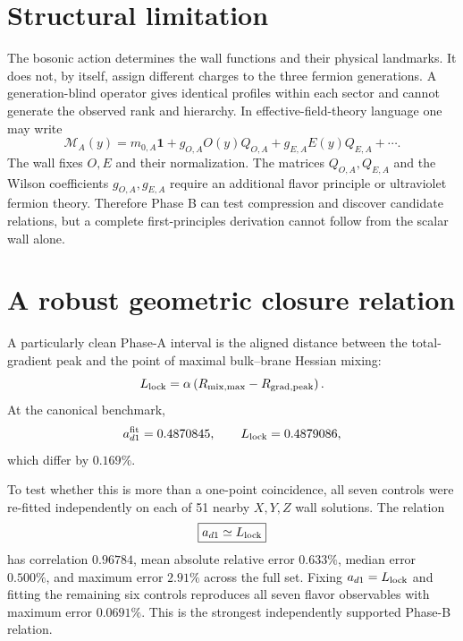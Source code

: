 \documentclass[11pt]{article}
\begin{document}
\section{Structural limitation}
The bosonic action determines the wall functions and their physical landmarks.  It does not, by itself, assign different charges to the three fermion generations.  A generation-blind operator gives identical profiles within each sector and cannot generate the observed rank and hierarchy.  In effective-field-theory language one may write
\begin{equation}
\mathcal M_A(y)=m_{0,A}\mathbf 1+
 g_{O,A}O(y)Q_{O,A}+g_{E,A}E(y)Q_{E,A}+\cdots .
\end{equation}
The wall fixes $O,E$ and their normalization.  The matrices $Q_{O,A},Q_{E,A}$ and the Wilson coefficients $g_{O,A},g_{E,A}$ require an additional flavor principle or ultraviolet fermion theory.  Therefore Phase B can test compression and discover candidate relations, but a complete first-principles derivation cannot follow from the scalar wall alone.

\section{A robust geometric closure relation}
A particularly clean Phase-A interval is the aligned distance between the total-gradient peak and the point of maximal bulk--brane Hessian mixing:
\begin{equation}
L_{\rm lock}=\alpha\left(R_{\rm mix,max}-R_{\rm grad,peak}\right).
\end{equation}
At the canonical benchmark,
\begin{equation}
a_{d1}^{\rm fit}=0.4870845,
\qquad
L_{\rm lock}=0.4879086,
\end{equation}
which differ by $0.169\%$.

To test whether this is more than a one-point coincidence, all seven controls were re-fitted independently on each of 51 nearby $X,Y,Z$ wall solutions.  The relation
\begin{equation}
\boxed{a_{d1}\simeq L_{\rm lock}}
\end{equation}
has correlation $0.96784$, mean absolute relative error $0.633\%$, median error $0.500\%$, and maximum error $2.91\%$ across the full set.  Fixing $a_{d1}=L_{\rm lock}$ and fitting the remaining six controls reproduces all seven flavor observables with maximum error $0.0691\%$.  This is the strongest independently supported Phase-B relation.
\end{document}
